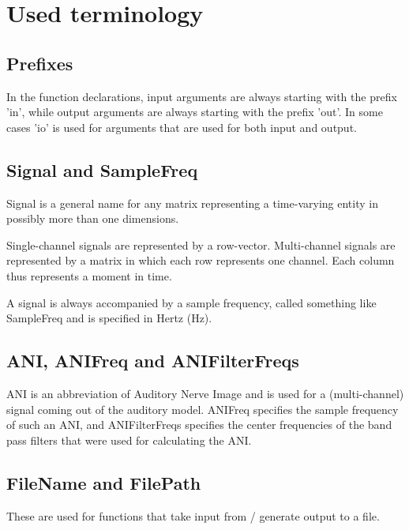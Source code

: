 \hypertarget{FuncRef:ReferenceTerminology}{
\section{Used terminology}}

\subsection{Prefixes}

In the function declarations, input arguments are always starting
with the prefix 'in', while output arguments are always starting
with the prefix 'out'. In some cases 'io' is used for arguments
that are used for both input and output.


\subsection{Signal and SampleFreq}

Signal is a general name for any matrix representing a
time-varying entity in possibly more than one dimensions.

Single-channel signals are represented by a row-vector.
Multi-channel signals are represented by a matrix in which each
row represents one channel. Each column thus represents a moment
in time.

A signal is always accompanied by a sample frequency, called
something like SampleFreq and is specified in Hertz (Hz).


\subsection{ANI, ANIFreq and ANIFilterFreqs}

ANI is an abbreviation of Auditory Nerve Image and is used for a
(multi-channel) signal coming out of the auditory model. ANIFreq
specifies the sample frequency of such an ANI, and ANIFilterFreqs
specifies the center frequencies of the band pass filters that
were used for calculating the ANI.


\subsection{FileName and FilePath}

These are used for functions that take input from / generate
output to a file.


